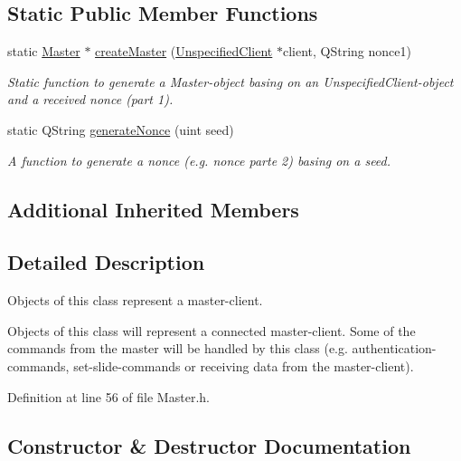 \subsection*{Static Public Member Functions}
\begin{DoxyCompactItemize}
\item 
static \hyperlink{class_server_appl_1_1_master}{Master} $\ast$ \hyperlink{class_server_appl_1_1_master_a6f7f0653f75d230211ea71a18b3a11a5}{create\+Master} (\hyperlink{class_server_appl_1_1_unspecified_client}{Unspecified\+Client} $\ast$client, Q\+String nonce1)
\begin{DoxyCompactList}\small\item\em Static function to generate a Master-\/object basing on an Unspecified\+Client-\/object and a received nonce (part 1). \end{DoxyCompactList}\item 
static Q\+String \hyperlink{class_server_appl_1_1_master_a6fabe470a327c8415b925514723b92e9}{generate\+Nonce} (uint seed)
\begin{DoxyCompactList}\small\item\em A function to generate a nonce (e.\+g. nonce parte 2) basing on a seed. \end{DoxyCompactList}\end{DoxyCompactItemize}
\subsection*{Additional Inherited Members}


\subsection{Detailed Description}
Objects of this class represent a master-\/client. 

Objects of this class will represent a connected master-\/client. Some of the commands from the master will be handled by this class (e.\+g. authentication-\/commands, set-\/slide-\/commands or receiving data from the master-\/client). 

Definition at line 56 of file Master.\+h.



\subsection{Constructor \& Destructor Documentation}
\hypertarget{class_server_appl_1_1_master_afa904310825c83e664b99f4fe6af5c2f}{}
